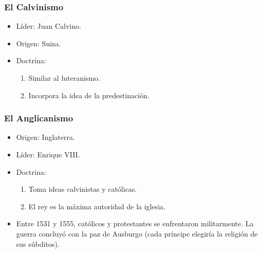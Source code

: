 \subsubsection{El Calvinismo}

\begin{itemize}

\item Líder: Juan Calvino.
\item Origen: Suiza.

\item Doctrina:
\begin{enumerate}
	\item Similar al luteranismo.
	\item Incorpora la idea de la predestinación.
\end{enumerate}

\end{itemize}

\subsubsection{El Anglicanismo}

\begin{itemize}

\item Origen: Inglaterra.
\item Líder: Enrique VIII.

\item Doctrina:
\begin{enumerate}
	\item Toma ideas calvinistas y católicas.
	\item El rey es la máxima autoridad de la iglesia.
\end{enumerate}

\item Entre 1531 y 1555, católicos y protestantes se enfrentaron militarmente.
La guerra concluyó con la paz de Ausburgo (cada príncipe elegiría la religión de sus súbditos).

\end{itemize}